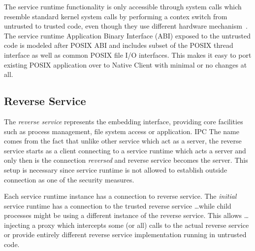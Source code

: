 The service runtime functionality is only accessible through system
calls which resemble standard kernel system calls by performing a contex
switch from untrusted to trusted code, even though they use different
hardware mechanism~\cite{yee:ieee-sp09,sehr:usenix-sec10}. The service
runtime Application Binary Interface (ABI) exposed to the untrusted code
is modeled after POSIX ABI and includes subset of the POSIX thread
interface as well as common POSIX file I/O interfaces. This makes it
easy to port existing POSIX application over to Native Client with
minimal or no changes at all.


\subsection{Reverse Service}


The \emph{reverse service} represents the embedding interface, providing
core facilities such as process management, file system access or
application. IPC %
The name comes from the fact that unlike other service which act as a
server, the reverse service starts as a client connecting to a service
runtime which acts a server and only then is the connection
\emph{reversed} and reverse service becomes the server. This setup is
necessary since service runtime is not allowed to establish outside
connection as one of the security measures.

Each service runtime instance has a connection to reverse service. The
\emph{initial} service runtime has a connection to the trusted reverse
service \ldots while child processes might be using a different instance
of the reverse service. This allows \ldots injecting a proxy which
intercepts some (or all) calls to the actual reverse service or provide
entirely different reverse service implementation running in untrusted
code.

